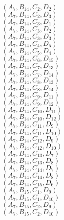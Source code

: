 \documentclass[14pt]{article}
\begin{document}
    $({A}_{7}, {B}_{14}, {C}_{2}, {D}_{2}) $ \\ 
    $({A}_{7}, {B}_{14}, {C}_{2}, {D}_{3}) $ \\ 
    $({A}_{7}, {B}_{14}, {C}_{3}, {D}_{1}) $ \\ 
    $({A}_{7}, {B}_{14}, {C}_{3}, {D}_{2}) $ \\ 
    $({A}_{7}, {B}_{14}, {C}_{3}, {D}_{3}) $ \\ 
    $({A}_{7}, {B}_{14}, {C}_{4}, {D}_{5}) $ \\ 
    $({A}_{7}, {B}_{14}, {C}_{5}, {D}_{4}) $ \\ 
    $({A}_{7}, {B}_{14}, {C}_{6}, {D}_{15}) $ \\ 
    $({A}_{7}, {B}_{14}, {C}_{7}, {D}_{13}) $ \\ 
    $({A}_{7}, {B}_{14}, {C}_{7}, {D}_{14}) $ \\ 
    $({A}_{7}, {B}_{14}, {C}_{8}, {D}_{13}) $ \\ 
    $({A}_{7}, {B}_{14}, {C}_{8}, {D}_{14}) $ \\ 
    $({A}_{7}, {B}_{14}, {C}_{9}, {D}_{11}) $ \\ 
    $({A}_{7}, {B}_{14}, {C}_{9}, {D}_{12}) $ \\ 
    $({A}_{7}, {B}_{14}, {C}_{10}, {D}_{11}) $ \\ 
    $({A}_{7}, {B}_{14}, {C}_{10}, {D}_{12}) $ \\ 
    $({A}_{7}, {B}_{14}, {C}_{11}, {D}_{9}) $ \\ 
    $({A}_{7}, {B}_{14}, {C}_{11}, {D}_{10}) $ \\ 
    $({A}_{7}, {B}_{14}, {C}_{12}, {D}_{9}) $ \\ 
    $({A}_{7}, {B}_{14}, {C}_{12}, {D}_{10}) $ \\ 
    $({A}_{7}, {B}_{14}, {C}_{13}, {D}_{7}) $ \\ 
    $({A}_{7}, {B}_{14}, {C}_{13}, {D}_{8}) $ \\ 
    $({A}_{7}, {B}_{14}, {C}_{14}, {D}_{7}) $ \\ 
    $({A}_{7}, {B}_{14}, {C}_{14}, {D}_{8}) $ \\ 
    $({A}_{7}, {B}_{14}, {C}_{15}, {D}_{6}) $ \\ 
    $({A}_{7}, {B}_{15}, {C}_{1}, {D}_{9}) $ \\ 
    $({A}_{7}, {B}_{15}, {C}_{1}, {D}_{10}) $ \\ 
    $({A}_{7}, {B}_{15}, {C}_{2}, {D}_{9}) $ \\ 
    $({A}_{7}, {B}_{15}, {C}_{2}, {D}_{10}) $ \\ 
\end{document}
